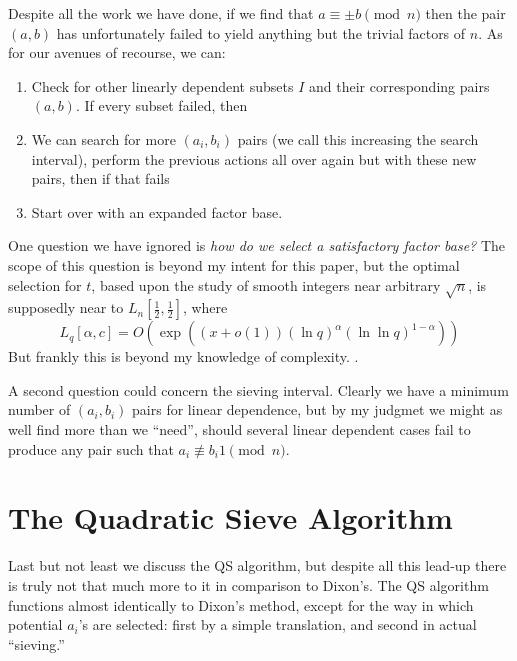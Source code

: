 \documentclass{report}
\begin{document}
Despite all the work we have done, if we find that $a\equiv \pm b\pmod n$ then the pair $(a,b)$
has unfortunately failed to yield anything but the trivial factors of $n$.
As for our avenues of recourse, we can:
\begin{enumerate}
    \item Check for other linearly dependent subsets $I$ and their corresponding pairs $(a,b)$. If
        every subset failed, then
    \item We can search for more $(a_i,b_i)$ pairs (we call this increasing the search interval),
        perform the previous actions all over again but with these new pairs, then if that fails
    \item Start over with an expanded factor base.
\end{enumerate}

One question we have ignored is \emph{how do we select a satisfactory factor base?}
The scope of this question is beyond my intent for this paper, but the optimal selection for $t$,
based upon the study of smooth integers near arbitrary $\sqrt n$, is supposedly near to $L_n[\frac 1
2,\frac 1 2]$, where
\[
    L_q[\alpha,c]
    = O(\exp((x+o(1))(\ln q)^\alpha(\ln \ln q)^{1-\alpha}))
\]
But frankly this is beyond my knowledge of complexity.
\cite{handbook}.

A second question could concern the sieving interval.
Clearly we have a minimum number of $(a_i,b_i)$ pairs for linear dependence, but by my judgmet
we might as well find more than we ``need'', should several linear dependent cases fail to produce
any pair such that $a_i\not\equiv b_i1\pmod n$.

\section{The Quadratic Sieve Algorithm}

Last but not least we discuss the QS algorithm, but despite all this lead-up there is truly not that
much more to it in comparison to Dixon's. The QS algorithm functions almost identically to Dixon's
method, except for the way in which potential $a_i$'s are selected: first by a simple translation,
and second in actual ``sieving.''
\end{document}
